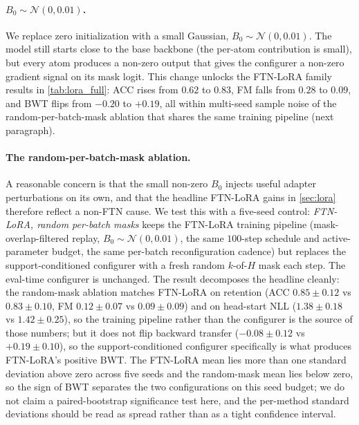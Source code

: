 \paragraph{$B_0\!\sim\!\mathcal{N}(0,0.01)$.}
We replace zero initialization with a small Gaussian, $B_0\!\sim\!\mathcal{N}(0,0.01)$. The model still starts close to the base backbone (the per-atom contribution is small), but every atom produces a non-zero output that gives the configurer a non-zero gradient signal on its mask logit. This change unlocks the FTN-LoRA family results in \cref{tab:lora_full}: ACC rises from $0.62$ to $0.83$, FM falls from $0.28$ to $0.09$, and BWT flips from $-0.20$ to $+0.19$, all within multi-seed sample noise of the random-per-batch-mask ablation that shares the same training pipeline (next paragraph).

\paragraph{The random-per-batch-mask ablation.}
A reasonable concern is that the small non-zero $B_0$ injects useful adapter perturbations on its own, and that the headline FTN-LoRA gains in \cref{sec:lora} therefore reflect a non-FTN cause. We test this with a five-seed control: \emph{FTN-LoRA, random per-batch masks} keeps the FTN-LoRA training pipeline (mask-overlap-filtered replay, $B_0\!\sim\!\mathcal{N}(0,0.01)$, the same $100$-step schedule and active-parameter budget, the same per-batch reconfiguration cadence) but replaces the support-conditioned configurer with a fresh random $k$-of-$H$ mask each step. The eval-time configurer is unchanged. The result decomposes the headline cleanly: the random-mask ablation matches FTN-LoRA on retention (ACC $0.85\pm0.12$ vs $0.83\pm0.10$, FM $0.12\pm0.07$ vs $0.09\pm0.09$) and on head-start NLL ($1.38\pm0.18$ vs $1.42\pm0.25$), so the training pipeline rather than the configurer is the source of those numbers; but it does not flip backward transfer ($-0.08\pm0.12$ vs $+0.19\pm0.10$), so the support-conditioned configurer specifically is what produces FTN-LoRA's positive BWT. The FTN-LoRA mean lies more than one standard deviation above zero across five seeds and the random-mask mean lies below zero, so the sign of BWT separates the two configurations on this seed budget; we do not claim a paired-bootstrap significance test here, and the per-method standard deviations should be read as spread rather than as a tight confidence interval.

